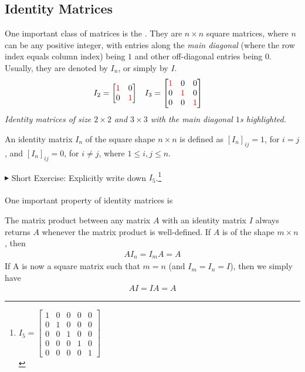 \subsection{Identity Matrices}
One important class of matrices is the . They are $n \times n$ square matrices, where $n$ can be any positive integer, with entries along the \textit{main diagonal} (where the row index equals column index) being $1$ and other off-diagonal entries being $0$. Usually, they are denoted by $I_n$, or simply by $I$.
{\begin{align*}
I_2 &= 
\begin{bmatrix}
\mathcolor{red}{1} & 0 \\
0 & \mathcolor{red}{1}
\end{bmatrix}
& I_3 &= 
\begin{bmatrix}
\mathcolor{red}{1} & 0 & 0 \\
0 & \mathcolor{red}{1} & 0 \\
0 & 0 & \mathcolor{red}{1}
\end{bmatrix}
\end{align*}
\textit{Identity matrices of size $2 \times 2$ and $3 \times 3$ with the main diagonal $1$s highlighted.}}
\begin{defn}
\label{defn:identity}
An identity matrix $I_n$ of the square shape $n \times n$ is defined as $[I_{n}]_{ij} = 1$, for $i = j$, and $[I_{n}]_{ij} = 0$, for $i \neq j$, where $1 \leq i,j \leq n$.
\end{defn}
$\blacktriangleright$ Short Exercise: Explicitly write down $I_5$.\footnote{$I_5=
\begin{bmatrix}
1 & 0 & 0 & 0 & 0 \\
0 & 1 & 0 & 0 & 0 \\
0 & 0 & 1 & 0 & 0 \\
0 & 0 & 0 & 1 & 0 \\
0 & 0 & 0 & 0 & 1
\end{bmatrix}$\\}\\
\\
One important property of identity matrices is
\begin{proper}
\label{proper:identity}
The matrix product between any matrix $A$ with an identity matrix $I$ always returns $A$ whenever the matrix product is well-defined. If $A$ is of the shape $m \times n$, then 
\begin{align}
AI_n = I_mA = A    
\end{align}
If A is now a square matrix such that $m=n$ (and $I_m = I_n = I$), then we simply have 
\begin{align}
AI = IA = A    
\end{align}
\end{proper}
